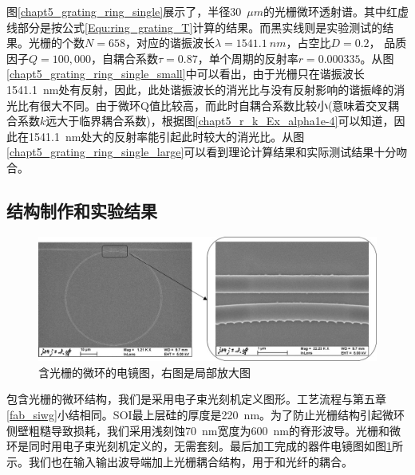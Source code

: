 图\ref{chapt5_grating_ring_single}展示了，半径30~$\mu m$的光栅微环透射谱。其中红虚线部分是按公式\ref{Equ:ring_grating_T}计算的结果。而黑实线则是实验测试的结果。光栅的个数$N = 658$，对应的谐振波长$\lambda = 1541.1~nm$，占空比$D = 0.2$， 品质因子$Q = 100,000$，自耦合系数$\tau = 0.87$，单个周期的反射率$r = 0.000335$。从图\ref{chapt5_grating_ring_single_small}中可以看出，由于光栅只在谐振波长1541.1~nm处有反射，因此，此处谐振波长的消光比与没有反射影响的谐振峰的消光比有很大不同。由于微环Q值比较高，而此时自耦合系数比较小(意味着交叉耦合系数$k$远大于临界耦合系数)，根据图\ref{chapt5_r_k_Ex_alpha1e-4}可以知道，因此在1541.1~nm处大的反射率能引起此时较大的消光比。从图\ref{chapt5_grating_ring_single_large}可以看到理论计算结果和实际测试结果十分吻合。

\subsection{结构制作和实验结果}
\begin{figure}[htb]
	\centering
	\includegraphics[width=12cm]{./Pictures/chapt5_ring_grating_reflector_structure_real.jpg}
	\caption{含光栅的微环的电镜图，右图是局部放大图}
	\label{chapt5_ring_grating_reflector_structure_real}
\end{figure}
包含光栅的微环结构，我们是采用电子束光刻机定义图形。工艺流程与第五章\ref{fab_siwg}小结相同。SOI最上层硅的厚度是220~nm。为了防止光栅结构引起微环侧壁粗糙导致损耗，我们采用浅刻蚀70~nm宽度为600~nm的脊形波导。光栅和微环是同时用电子束光刻机定义的，无需套刻。最后加工完成的器件电镜图如图\ref{chapt5_ring_grating_reflector_structure_real}所示。我们也在输入输出波导端加上光栅耦合结构，用于和光纤的耦合。

